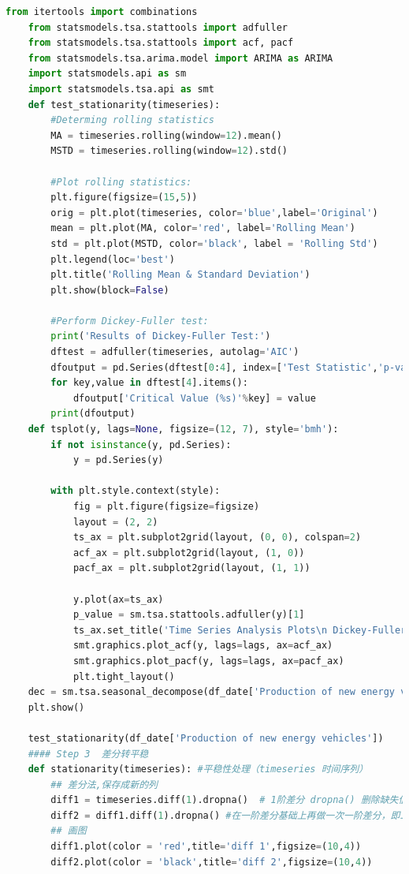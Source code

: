 \documentclass{apmcmthesis}
\begin{document}
\begin{lstlisting}[language=Python,caption={The Python Source code of Algorithm}]
    from itertools import combinations
    from statsmodels.tsa.stattools import adfuller
    from statsmodels.tsa.stattools import acf, pacf
    from statsmodels.tsa.arima.model import ARIMA as ARIMA
    import statsmodels.api as sm
    import statsmodels.tsa.api as smt
    def test_stationarity(timeseries):
        #Determing rolling statistics
        MA = timeseries.rolling(window=12).mean()
        MSTD = timeseries.rolling(window=12).std()
    
        #Plot rolling statistics:
        plt.figure(figsize=(15,5))
        orig = plt.plot(timeseries, color='blue',label='Original')
        mean = plt.plot(MA, color='red', label='Rolling Mean')
        std = plt.plot(MSTD, color='black', label = 'Rolling Std')
        plt.legend(loc='best')
        plt.title('Rolling Mean & Standard Deviation')
        plt.show(block=False)
    
        #Perform Dickey-Fuller test:
        print('Results of Dickey-Fuller Test:')
        dftest = adfuller(timeseries, autolag='AIC')
        dfoutput = pd.Series(dftest[0:4], index=['Test Statistic','p-value','#Lags Used','Number of Observations Used'])
        for key,value in dftest[4].items():
            dfoutput['Critical Value (%s)'%key] = value
        print(dfoutput)
    def tsplot(y, lags=None, figsize=(12, 7), style='bmh'):
        if not isinstance(y, pd.Series):
            y = pd.Series(y)
            
        with plt.style.context(style):    
            fig = plt.figure(figsize=figsize)
            layout = (2, 2)
            ts_ax = plt.subplot2grid(layout, (0, 0), colspan=2)
            acf_ax = plt.subplot2grid(layout, (1, 0))
            pacf_ax = plt.subplot2grid(layout, (1, 1))
            
            y.plot(ax=ts_ax)
            p_value = sm.tsa.stattools.adfuller(y)[1]
            ts_ax.set_title('Time Series Analysis Plots\n Dickey-Fuller: p={0:.5f}'.format(p_value))
            smt.graphics.plot_acf(y, lags=lags, ax=acf_ax)
            smt.graphics.plot_pacf(y, lags=lags, ax=pacf_ax)
            plt.tight_layout()
    dec = sm.tsa.seasonal_decompose(df_date['Production of new energy vehicles'],period = 12,model = 'additive').plot()
    plt.show()
    
    test_stationarity(df_date['Production of new energy vehicles'])
    #### Step 3  差分转平稳
    def stationarity(timeseries): #平稳性处理（timeseries 时间序列）
        ## 差分法,保存成新的列
        diff1 = timeseries.diff(1).dropna()  # 1阶差分 dropna() 删除缺失值
        diff2 = diff1.diff(1).dropna() #在一阶差分基础上再做一次一阶差分，即二阶查分
        ## 画图
        diff1.plot(color = 'red',title='diff 1',figsize=(10,4))
        diff2.plot(color = 'black',title='diff 2',figsize=(10,4))
    

\end{lstlisting}
\end{document}

